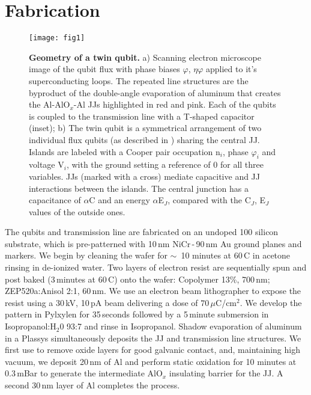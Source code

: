 \section{Fabrication}


\begin{figure}[h]
  \texttt{[image: fig1]}
  \caption{\small  \textbf{Geometry  of  a  twin qubit.}   a)  Scanning  electron
    microscope   image  of   the   qubit  flux   with  phase   biases   $  \varphi   $,
    $ \eta\varphi  $ applied to it's  superconducting loops. The repeated  line structures
    are the  byproduct of the  double-angle evaporation of aluminum  that creates
    the Al-AlO$_x$-Al  JJs highlighted in  red and pink.   Each of the  qubits is
    coupled to  the transmission line with  a T-shaped capacitor (inset);  b) The
    twin qubit  is a symmetrical  arrangement of  two individual flux  qubits (as
    described in \cite{orlando1999}) sharing the central JJ.  Islands are labeled
    with a Cooper pair occupation n$_i$,  phase $\varphi_i$ and voltage V$_i$, with the
    ground setting a reference of 0 for  all three variables.  JJs (marked with a
    cross)  mediate capacitive  and  JJ interactions  between  the islands.   The
    central   junction    has   a   capacitance    of   $\alpha$C   and    an   energy
    $ \alpha$E$_{J}$, compared with the C$_J$, E$_J$ values of the outside ones.}
  \label{fig:setup}
\end{figure}

\noindent  The qubits  and transmission  line are  fabricated on  an undoped  100
silicon substrate, which  is pre-patterned with 10\,nm  NiCr\,-\,90\,nm Au ground
planes and markers. We begin by cleaning the wafer for $\sim$~10 minutes at 60\,C in
acetone  rinsing  in  de-ionized  water.   Two  layers  of  electron  resist  are
sequentially spun and post baked (3\,minutes at 60\,C) onto the wafer: {Copolymer
  13\%},  700\,nm;  ZEP520a:Anisol   2:1,  60\,nm.   We  use   an  electron  beam
lithographer to expose  the resist using a 30\,kV, 10\,pA  beam delivering a dose
of  $ 70\,\mu  $C/cm$^2$.   We  develop the  pattern  in  Pylxylen for  35\,seconds
followed  by a  5\,minute  submersion  in Isopropanol:H$_2$0  93:7  and rinse  in
Isopropanol.   Shadow   evaporation  of  aluminum  in   a  Plassys  \cite{wu2013}
simultaneously deposits  the JJ and  transmission line structures.  We  first use
 to  remove  oxide  layers for  good  galvanic contact,  and,
maintaining high vacuum, we deposit 20\,nm of Al and perform static oxidation for
10 minutes at  0.3\,mBar to generate the intermediate  AlO$_x$ insulating barrier
for the JJ.  A second 30\,nm layer of Al completes the process.


